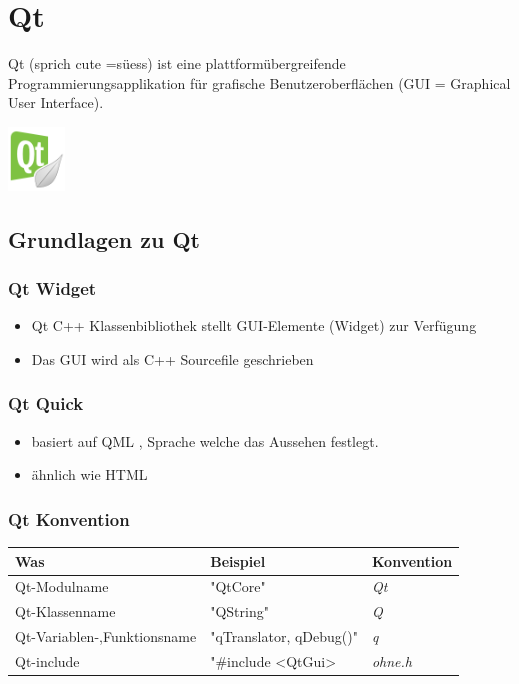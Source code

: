 \section{Qt}
\begin{minipage}{17cm}
	Qt (sprich cute =süess) ist eine plattformübergreifende Programmierungsapplikation für grafische Benutzeroberflächen (GUI = Graphical User Interface).
\end{minipage}
\begin{minipage}{1.5cm}
	\includegraphics[width=1.5cm]{images/qt_logo.jpg}
\end{minipage}

\subsection{Grundlagen zu Qt}
\begin{multicols}{2}
\subsubsection{Qt Widget}
	\begin{itemize}
		\item Qt C++ Klassenbibliothek stellt GUI-Elemente (Widget) zur Verfügung
		\item Das GUI wird als C++ Sourcefile geschrieben
	\end{itemize}
\subsubsection{Qt Quick}
	\begin{itemize}
		\item basiert auf QML , Sprache welche das Aussehen festlegt.
		\item ähnlich wie HTML
	\end{itemize}	
\end{multicols}

\subsubsection{Qt Konvention}
\begin{tabular}{|l|l|l|}
	\hline \textbf{Was} & \textbf{Beispiel} &\textbf{Konvention}\\
	\hline Qt-Modulname & "QtCore"& \textit{Qt}\\
	\hline Qt-Klassenname & "QString" & \textit{Q}\\
	\hline Qt-Variablen-,Funktionsname & "qTranslator, qDebug()"& \textit{q}\\
	\hline Qt-include & "\#include <QtGui>& \textit{ohne.h}\\
	\hline
\end{tabular}


